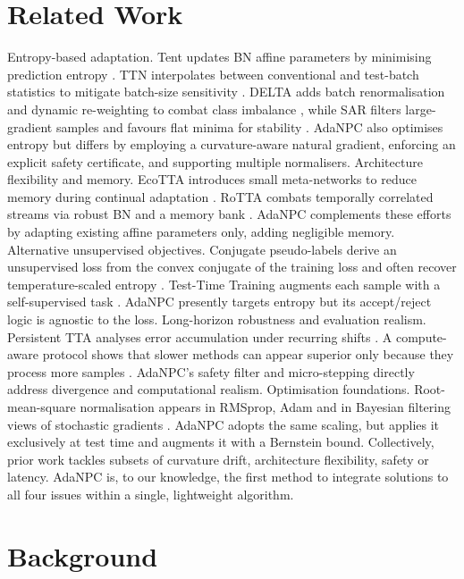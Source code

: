 \documentclass{article} %
\begin{document}
\section{Related Work}
\label{sec:related}
Entropy-based adaptation. Tent updates BN affine parameters by minimising prediction entropy \cite{wang-2020-tent}. TTN interpolates between conventional and test-batch statistics to mitigate batch-size sensitivity \cite{lim-2023-ttn}. DELTA adds batch renormalisation and dynamic re-weighting to combat class imbalance \cite{zhao-2023-delta}, while SAR filters large-gradient samples and favours flat minima for stability \cite{niu-2023-towards}. AdaNPC also optimises entropy but differs by employing a curvature-aware natural gradient, enforcing an explicit safety certificate, and supporting multiple normalisers.
Architecture flexibility and memory. EcoTTA introduces small meta-networks to reduce memory during continual adaptation \cite{song-2023-ecotta}. RoTTA combats temporally correlated streams via robust BN and a memory bank \cite{yuan-2023-robust}. AdaNPC complements these efforts by adapting existing affine parameters only, adding negligible memory.
Alternative unsupervised objectives. Conjugate pseudo-labels derive an unsupervised loss from the convex conjugate of the training loss and often recover temperature-scaled entropy \cite{goyal-2022-test}. Test-Time Training augments each sample with a self-supervised task \cite{sun-2019-test}. AdaNPC presently targets entropy but its accept/reject logic is agnostic to the loss.
Long-horizon robustness and evaluation realism. Persistent TTA analyses error accumulation under recurring shifts \cite{hoang-2023-persistent}. A compute-aware protocol shows that slower methods can appear superior only because they process more samples \cite{alfarra-2023-evaluation}. AdaNPC's safety filter and micro-stepping directly address divergence and computational realism.
Optimisation foundations. Root-mean-square normalisation appears in RMSprop, Adam and in Bayesian filtering views of stochastic gradients \cite{aitchison-2018-bayesian}. AdaNPC adopts the same scaling, but applies it exclusively at test time and augments it with a Bernstein bound.
Collectively, prior work tackles subsets of curvature drift, architecture flexibility, safety or latency. AdaNPC is, to our knowledge, the first method to integrate solutions to all four issues within a single, lightweight algorithm.

\section{Background}
\label{sec:background}
\end{document}
